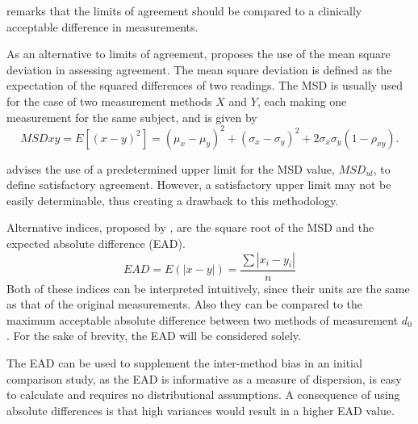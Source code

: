 \documentclass[12pt, a4paper]{report}
\theoremstyle{plain}
\theoremstyle{definition}
\theoremstyle{remark}
\begin{document}
\citet{Dewitte} remarks that the limits of agreement should be
compared to a clinically acceptable difference in measurements.

As an alternative to limits of agreement, \citet{lin2002} proposes the use of
the mean square deviation in assessing agreement. The mean square
deviation is defined as the expectation of the squared differences
of two readings. The MSD is usually used for the case of two
measurement methods $X$ and $Y$, each making one measurement for
the same subject, and is given by
\[
MSDxy = E[(x - y)^2]  = (\mu_{x} - \mu_{y})^2 + (\sigma_{x} -
\sigma_{y})^2 + 2\sigma_{x}\sigma_{y}(1-\rho_{xy}).
\]


\citet{Barnhart} advises the use of a predetermined upper limit
for the MSD value, $MSD_{ul}$, to define satisfactory agreement.
However, a satisfactory upper limit may not be easily
determinable, thus creating a drawback to this methodology.


Alternative indices, proposed by \citet{Barnhart}, are the square root of the MSD and the expected absolute difference (EAD). 
\[
EAD = E(|x - y|) = \frac{\sum |x_{i}- y_{i}|}{n}
\]
Both of these indices can be interpreted intuitively, since their units are the same as that of the original measurements. Also they can be compared to the maximum acceptable absolute difference between two methods of measurement $d_{0}$. For the sake of brevity, the EAD will be considered solely.

The EAD can be used to supplement the inter-method bias in an
initial comparison study, as the EAD is informative as a measure
of dispersion, is easy to calculate and requires no distributional
assumptions. A consequence of using absolute differences is that high variances would result in a higher EAD value. 
\end{document}
